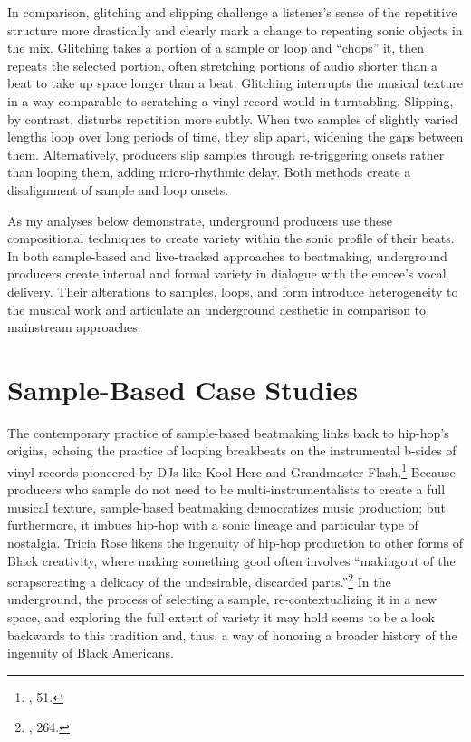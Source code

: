 In comparison, glitching and slipping challenge a listener's sense of the repetitive structure 
more drastically and clearly mark a change to repeating sonic objects in the mix. Glitching takes 
a portion of a sample or loop and ``chops'' it, then repeats the selected portion, often stretching 
portions of audio shorter than a beat to take up space longer than a beat. Glitching interrupts the 
musical texture in a way comparable to scratching a vinyl record would in turntabling. Slipping, by 
contrast, disturbs repetition more subtly. When two samples of slightly varied lengths loop over long 
periods of time, they slip apart, widening the gaps between them. Alternatively, producers slip 
samples through re-triggering onsets rather than looping them, adding micro-rhythmic delay. Both 
methods create a disalignment of sample and loop onsets.

As my analyses below demonstrate, underground producers use these compositional techniques to create 
variety within the sonic profile of their beats. In both sample-based and live-tracked approaches to
beatmaking, underground producers create internal and formal variety in dialogue with the emcee's vocal
delivery. Their alterations to samples, loops, and form introduce heterogeneity to the musical work and
articulate an underground aesthetic in comparison to mainstream approaches.

\section{Sample-Based Case Studies}
The contemporary practice of sample-based beatmaking links back to hip-hop's origins, echoing the 
practice of looping breakbeats on the instrumental b-sides of vinyl records pioneered by DJs like 
Kool Herc and Grandmaster Flash.\footnote{\cite{triciaroseBlackNoiseRap1994}, 51.} Because producers 
who sample do not need to be multi-instrumentalists to create a full musical texture, sample-based 
beatmaking democratizes music production; but furthermore, it imbues hip-hop with a sonic lineage and
particular type of nostalgia. Tricia Rose likens the ingenuity of hip-hop production to other forms of 
Black creativity, where making something good often involves ``making\textellipsis out of the
scraps\textemdash creating a delicacy of the undesirable, discarded parts.''\footnote{\cite{triciaroseHipHopWarsWhat2008}, 264.} In the underground, the process of 
selecting a sample, re-contextualizing it in a new space, and exploring the full extent of variety 
it may hold seems to be a look backwards to this tradition and, thus, a way of honoring a broader 
history of the ingenuity of Black Americans.

